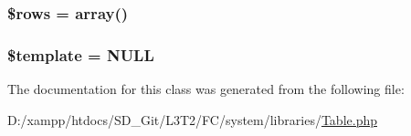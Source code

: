 \subsubsection[{\$rows}]{\setlength{\rightskip}{0pt plus 5cm}\$rows = array()}\label{class_c_i___table_ace2ec39e7df3899fa8df9640ec274b03}
\hypertarget{class_c_i___table_aa3e9534005fd516d941f6a5569896e01}{}
\subsubsection[{\$template}]{\setlength{\rightskip}{0pt plus 5cm}\$template = N\+U\+L\+L}\label{class_c_i___table_aa3e9534005fd516d941f6a5569896e01}


The documentation for this class was generated from the following file\+:\begin{DoxyCompactItemize}
\item 
D\+:/xampp/htdocs/\+S\+D\+\_\+\+Git/\+L3\+T2/\+F\+C/system/libraries/\hyperlink{system_2libraries_2_table_8php}{Table.\+php}\end{DoxyCompactItemize}
